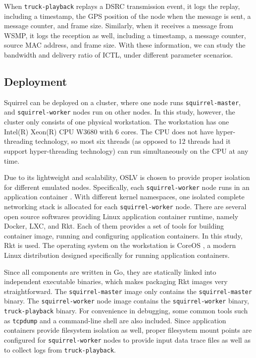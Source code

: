 \documentclass[12pt]{report}
\begin{document}
When \texttt{truck-playback} replays a DSRC transmission event, it logs the replay, including a timestamp, the GPS position of the node when the message is sent, a message counter, and frame size. Similarly, when it receives a message from WSMP, it logs the reception as well, including a timestamp, a message counter, source MAC address, and frame size. With these information, we can study the bandwidth and delivery ratio of ICTL, under different parameter scenarios.

\subsection{Deployment}

Squirrel can be deployed on a cluster, where one node runs \texttt{squirrel-master}, and \texttt{squirrel-worker} nodes run on other nodes. In this study, however, the cluster only consists of one physical workstation. The workstation has one Intel(R) Xeon(R) CPU W3680 with 6 cores. The CPU does not have hyper-threading technology, so most six threads (as opposed to 12 threads had it support hyper-threading technology) can run simultaneously on the CPU at any time.

Due to its lightweight and scalability, OSLV is chosen to provide proper isolation for different emulated nodes. Specifically, each \texttt{squirrel-worker} node runs in an application container \cite{menage2007adding}. With different kernel namespaces, one isolated complete networking stack is allocated for each \texttt{squirrel-worker} node. There are several open source softwares providing Linux application container runtime, namely Docker, LXC, and Rkt. Each of them provides a set of tools for building container image, running and configuring application containers. In this study, Rkt \cite{rkt} is used. The operating system on the workstation is CoreOS \cite{coreos}, a modern Linux distribution designed specifically for running application containers.

Since all components are written in Go, they are statically linked into independent executable binaries, which makes packaging Rkt images very straightforward. The \texttt{squirrel-master} image only contains the \texttt{squirrel-master} binary. The \texttt{squirrel-worker} node image contains the \texttt{squirrel-worker} binary, \texttt{truck-playback} binary. For convenience in debugging, some common tools such as \texttt{tcpdump} and a command-line shell are also included. Since application containers provide filesystem isolation as well, proper filesystem mount points are configured for \texttt{squirrel-worker} nodes to provide input data trace files as well as to collect logs from \texttt{truck-playback}.
\end{document}
